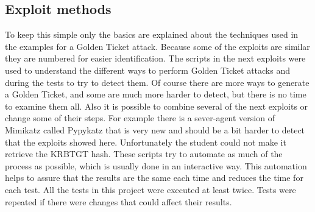 \subsection{Exploit methods}
To keep this simple only the basics are explained about the techniques used in the examples for a Golden Ticket attack. Because some of the exploits are similar they are numbered for easier identification. The scripts in the next exploits were used to understand the different ways to perform Golden Ticket attacks and during the tests to try to detect them. Of course there are more ways to generate a Golden Ticket, and some are much more harder to detect, but there is no time to examine them all. Also it is possible to combine several of the next exploits or change some of their steps.
\linej
For example there is a sever-agent version of Mimikatz called Pypykatz\cite{pypykatz_agent}\cite{pypykatz_server} that is very new and should be a bit harder to detect that the exploits showed here. Unfortunately the student could not make it retrieve the KRBTGT hash.
\linej
\linej
These scripts try to automate as much of the process as possible, which is usually done in an interactive way. This automation helps to assure that the results are the same each time and reduces the time for each test. All the tests in this project were executed at least twice. Tests were repeated if there were changes that could affect their results.


